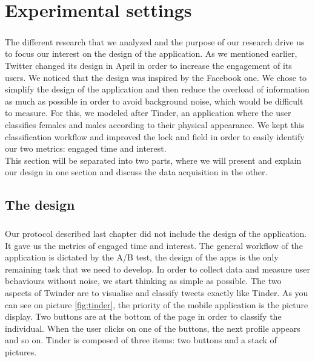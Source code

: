 \chapter{Experimental settings}

\paragraph{}
The different research that we analyzed and the purpose of our research drive us to focus our interest on the design of the application. As we mentioned earlier, Twitter changed its design in April in order to increase the engagement of its users. We noticed that the design was inspired by the Facebook one. We chose to simplify the design of the application and then reduce the overload of information as much as possible in order to avoid background noise, which would be difficult to measure. For this, we modeled after Tinder, an application where the user classifies females and males according to their physical appearance. We kept this classification workflow and improved the lock and field in order to easily identify our two metrics: engaged time and interest.\\
This section will be separated into two parts, where we will present and explain our design in one section and discuss the data acquisition in the other.

\section{The design}

\paragraph{}
Our protocol described last chapter did not include the design of the application. It gave us the metrics of engaged time and interest. The general workflow of the application is dictated by the A/B test, the design of the apps is the only remaining task that we need to develop. In order to collect data and measure user behaviours without noise, we start thinking as simple as possible. The two aspects of Twinder are to visualise and classify tweets exactly like Tinder. As you can see on picture \ref{fig:tinder}, the priority of the mobile application is the picture display. Two buttons are at the bottom of the page in order to classify the individual. When the user clicks on one of the buttons, the next profile appears and so on. Tinder is composed of three items: two buttons and a stack of pictures. \\

